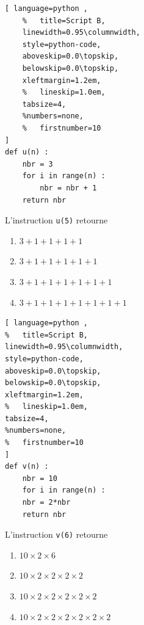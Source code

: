 \documentclass[main.tex]{subfiles}
\begin{document}
\begin{exercise}\hfill 
	

\noindent
\begin{minipage}{0.38\linewidth} 
\begin{lstlisting}[ language=python , 
	%	title=Script B,   
	linewidth=0.95\columnwidth,
	style=python-code,    
	aboveskip=0.0\topskip,
	belowskip=0.0\topskip,
	xleftmargin=1.2em,
	%	lineskip=1.0em,
	tabsize=4, 
	%numbers=none,
	%	firstnumber=10  
] 
def u(n) :
	nbr = 3
	for i in range(n) :
		nbr = nbr + 1
	return nbr
\end{lstlisting} 
\end{minipage} 
\hfill 
\parbox{0.6\linewidth}{
L'instruction \lstinline|u(5)| retourne \dotfill 
\begin{enumerate}[label=\ding{111}, leftmargin=*] 
	\item $3+1+1+1+1$
	\item $3+1+1+1+1+1$
	\item $3+1+1+1+1+1+1$
	\item $3+1+1+1+1+1+1+1$
\end{enumerate}
}

\noindent
\begin{minipage}{0.38\linewidth} 
\begin{lstlisting}[ language=python , 
%	title=Script B,   
linewidth=0.95\columnwidth,
style=python-code,    
aboveskip=0.0\topskip,
belowskip=0.0\topskip,
xleftmargin=1.2em,
%	lineskip=1.0em,
tabsize=4, 
%numbers=none,
%	firstnumber=10  
] 
def v(n) :
	nbr = 10
	for i in range(n) :
	nbr = 2*nbr
	return nbr
\end{lstlisting} 
\end{minipage} 
\hfill 
\parbox{0.6\linewidth}{
L'instruction \lstinline|v(6)| retourne \dotfill 
\begin{enumerate}[label=\ding{111}, leftmargin=*] 
\item $10\times 2 \times 6$ 
\item $10\times 2 \times 2 \times 2 \times 2$ 
\item $10\times 2 \times 2 \times 2 \times 2\times 2$ 
\item $10\times 2 \times 2 \times 2 \times 2\times 2\times 2$ 
\end{enumerate}
}



\end{exercise}
\end{document}
